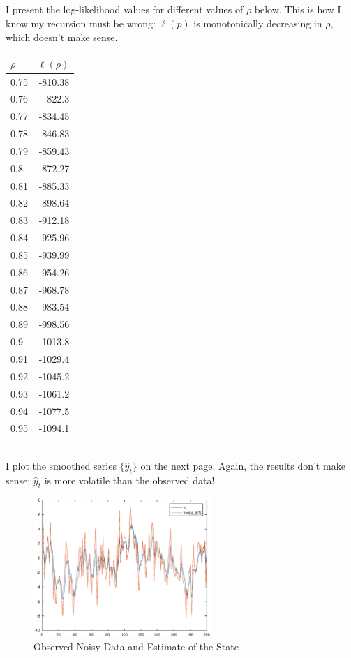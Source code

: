 \documentclass[12pt]{article}
\begin{document}
\subsection{}
I present the log-likelihood values for different values of $\rho$ below. This is how I know my recursion must be wrong: $\ell(p)$ is monotonically decreasing in $\rho$, which doesn't make sense.

\begin{table}[t!]
\centering
\begin{tabular}{l*{1}{r}}
\hline
       $\rho$     & $\ell(\rho)$\\
\hline
         0.75    &  -810.38 \\
         0.76     &  -822.3\\
         0.77      &-834.45\\
         0.78      &-846.83\\
         0.79      &-859.43\\
          0.8      &-872.27\\
         0.81     & -885.33\\
         0.82     & -898.64\\
         0.83     & -912.18\\
         0.84     & -925.96\\
         0.85     & -939.99\\
         0.86     & -954.26\\
         0.87      &-968.78\\
         0.88     & -983.54\\
         0.89    &  -998.56\\
          0.9     & -1013.8\\
         0.91    &  -1029.4\\
         0.92     & -1045.2\\
         0.93     & -1061.2\\
         0.94     & -1077.5\\
         0.95     & -1094.1\\
\hline
\end{tabular}
\end{table}

\subsection{} I plot the smoothed series $\{\hat y_t\}$ on the next page. Again, the results don't make sense: $\hat y_t$ is more volatile than the observed data!

\begin{figure}[h!]
    \centering
        \includegraphics[width=0.6\textwidth]{smooth.eps}
        \caption{Observed Noisy Data and Estimate of the State}
\end{figure}

\newpage
\end{document}
